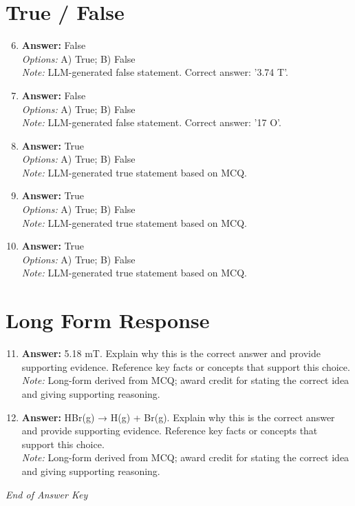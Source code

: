 \documentclass[12pt]{article}
\begin{document}
\section*{True / False}
\begin{enumerate}[label=\arabic*.]
\setcounter{enumi}{5}
\item \textbf{Answer:} False
\\ \textit{Options:} A) True; B) False
\\ \textit{Note:} LLM-generated false statement. Correct answer: '3.74 T'.
\item \textbf{Answer:} False
\\ \textit{Options:} A) True; B) False
\\ \textit{Note:} LLM-generated false statement. Correct answer: '17 O'.
\item \textbf{Answer:} True
\\ \textit{Options:} A) True; B) False
\\ \textit{Note:} LLM-generated true statement based on MCQ.
\item \textbf{Answer:} True
\\ \textit{Options:} A) True; B) False
\\ \textit{Note:} LLM-generated true statement based on MCQ.
\item \textbf{Answer:} True
\\ \textit{Options:} A) True; B) False
\\ \textit{Note:} LLM-generated true statement based on MCQ.
\end{enumerate}

\section*{Long Form Response}
\begin{enumerate}[label=\arabic*.]
\setcounter{enumi}{10}
\item \textbf{Answer:} 5.18 mT. Explain why this is the correct answer and provide supporting evidence. Reference key facts or concepts that support this choice.
\\ \textit{Note:} Long-form derived from MCQ; award credit for stating the correct idea and giving supporting reasoning.
\item \textbf{Answer:} HBr(g) → H(g) + Br(g). Explain why this is the correct answer and provide supporting evidence. Reference key facts or concepts that support this choice.
\\ \textit{Note:} Long-form derived from MCQ; award credit for stating the correct idea and giving supporting reasoning.
\end{enumerate}

\vfill
\noindent\textit{End of Answer Key}
\end{document}
